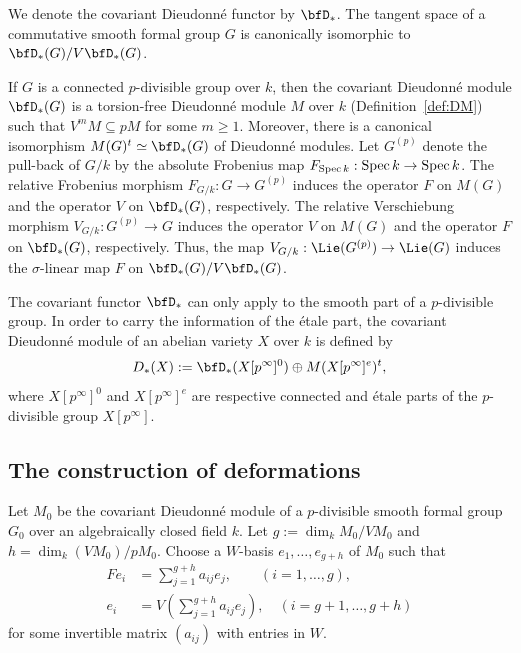 \documentclass[]{amsart}
\theoremstyle{plain}
\theoremstyle{definition}
\theoremstyle{remark}
\def\Spec{{\rm Spec}\,}
\newcommand{\<}{\langle}   %
\renewcommand{\>}{\rangle} %
\newcommand{\ac}{algebraically closed }
\newcommand{\dieu}{Dieudonn\'{e} }
\begin{document}
We denote the covariant \dieu functor by $\bfD_*$. The tangent space of a commutative smooth formal group $G$ is canonically isomorphic to
$\bfD_*(G)/V\bfD_*(G)$. 


If $G$ is a connected $p$-divisible group over $k$, then the covariant \dieu module $\bfD_*(G)$ is a torsion-free \dieu module $M$ over $k$ 
(Definition~\ref{def:DM}) such that $V^m M\subseteq pM$ for some $m\ge 1$. Moreover,
there is a canonical isomorphism $M(G)^t\simeq \bfD_*(G)$ of \dieu modules. 
Let $G^{(p)}$ denote the pull-back of $G/k$ by the absolute Frobenius map $F_{\Spec k}: \Spec k \to \Spec k$.
The relative Frobenius morphism $F_{G/k}: G\to G^{(p)}$ induces the operator $F$ on $M(G)$ and the operator $V$ on $\bfD_*(G)$, respectively. The relative Verschiebung morphism $V_{G/k}: G^{(p)}\to G$ induces the operator $V$ on $M(G)$ and the operator $F$ on $\bfD_*(G)$, respectively. Thus, the  map $V_{G/k}: \Lie(G^{(p)}) \to \Lie(G)$ induces the $\sigma$-linear map $F$ on $\bfD_*(G)/V \bfD_*(G)$.

The covariant functor $\bfD_*$ can only apply to the smooth part of a $p$-divisible group. In order to carry the information of the \'etale part,     
the covariant \dieu module of an abelian variety $X$ over $k$ is defined by 
\[ D_*(X):=\bfD_*(X[p^\infty]^0)\oplus M(X[p^\infty]^{e})^t, \]
where $X[p^\infty]^0$ and $X[p^\infty]^{e}$ are respective connected and \'etale parts of the $p$-divisible group $X[p^\infty]$. 

\subsection{The construction of deformations} \label{sec:2.4} 
Let $M_0$ be the covariant \dieu module of a $p$-divisible smooth formal group $G_0$ over an \ac field $k$. Let $g:=\dim_k M_0/V M_0$ and $h=\dim_k (V M_0)/p M_0$.
Choose a $W$-basis $e_1,\dots , e_{g+h}$ of $M_0$ such that
\begin{equation}
\begin{split}
    F e_i &=\sum_{j=1}^{g+h} a_{ij} e_j, \quad  \quad (i=1,\dots, g), \\ 
    e_i &= V(\sum_{j=1}^{g+h} a_{ij} e_j),  \quad (i=g + 1, \dots, g + h)  
\end{split}
\end{equation}
for some invertible matrix $(a_{ij})$ with entries in $W$.
 
\end{document}
